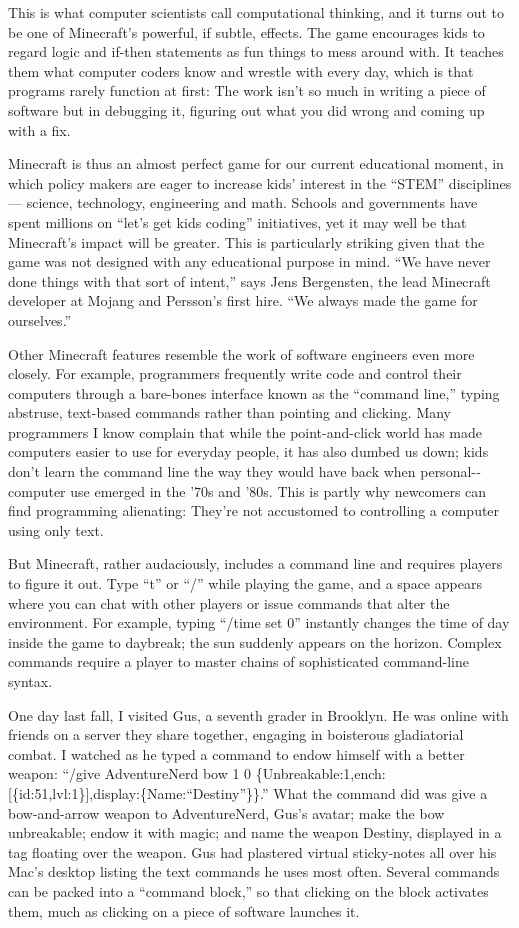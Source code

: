 This is what computer scientists call computational thinking, and it
turns out to be one of Minecraft's powerful, if subtle, effects. The
game encourages kids to regard logic and if-then statements as fun
things to mess around with. It teaches them what computer coders know
and wrestle with every day, which is that programs rarely function at
first: The work isn't so much in writing a piece of software but in
debugging it, figuring out what you did wrong and coming up with a fix.

Minecraft is thus an almost perfect game for our current educational
moment, in which policy makers are eager to increase kids' interest in
the ``STEM'' disciplines --- science, technology, engineering and math.
Schools and governments have spent millions on ``let's get kids coding''
initiatives, yet it may well be that Minecraft's impact will be greater.
This is particularly striking given that the game was not designed with
any educational purpose in mind. ``We have never done things with that
sort of intent,'' says Jens Bergensten, the lead Minecraft developer at
Mojang and Persson's first hire. ``We always made the game for
ourselves.''

Other Minecraft features resemble the work of software engineers even
more closely. For example, programmers frequently write code and control
their computers through a bare-bones interface known as the ``command
line,'' typing abstruse, text-­based commands rather than pointing and
clicking. Many programmers I know complain that while the
point-and-click world has made computers easier to use for everyday
people, it has also dumbed us down; kids don't learn the command line
the way they would have back when personal-­computer use emerged in the
'70s and '80s. This is partly why newcomers can find programming
alienating: They're not accustomed to controlling a computer using only
text.

But Minecraft, rather audaciously, includes a command line and requires
players to figure it out. Type ``t'' or ``/'' while playing the game,
and a space appears where you can chat with other players or issue
commands that alter the environment. For example, typing ``/time set 0''
instantly changes the time of day inside the game to daybreak; the sun
suddenly appears on the horizon. Complex commands require a player to
master chains of sophisticated command-­line syntax.

One day last fall, I visited Gus, a seventh ­grader in Brooklyn. He was
online with friends on a server they share together, engaging in
boisterous gladiatorial combat. I watched as he typed a command to endow
himself with a better weapon: ``/give AdventureNerd bow 1 0
\{Unbreakable:1,ench:{[}\{id:51,lvl:1\}{]},display:\{Name:``Destiny''\}\}.''
What the command did was give a bow-­and-­arrow weapon to AdventureNerd,
Gus's avatar; make the bow unbreakable; endow it with magic; and name
the weapon Destiny, displayed in a tag floating over the weapon. Gus had
plastered virtual sticky-­notes all over his Mac's desktop listing the
text commands he uses most often. Several commands can be packed into a
``command block,'' so that clicking on the block activates them, much as
clicking on a piece of software launches it.

